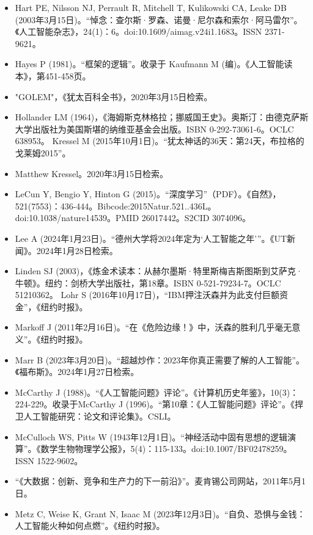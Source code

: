 \begin{itemize}
\item Hart PE, Nilsson NJ, Perrault R, Mitchell T, Kulikowski CA, Leake DB (2003年3月15日)。“悼念：查尔斯·罗森、诺曼·尼尔森和索尔·阿马雷尔”。《人工智能杂志》，24(1)：6。doi:10.1609/aimag.v24i1.1683。ISSN 2371-9621。  
\item Hayes P (1981)。“框架的逻辑”。收录于 Kaufmann M (编)。《人工智能读本》，第451-458页。  
\item "GOLEM"，《犹太百科全书》，2020年3月15日检索。  
\item Hollander LM (1964)，《海姆斯克林格拉；挪威国王史》。奥斯汀：由德克萨斯大学出版社为美国斯堪的纳维亚基金会出版。ISBN 0-292-73061-6。OCLC 638953。  
Kressel M (2015年10月1日)。“犹太神话的36天：第24天，布拉格的戈莱姆2015”。\item Matthew Kressel。2020年3月15日检索。  
\item LeCun Y, Bengio Y, Hinton G (2015)。“深度学习”（PDF）。《自然》，521(7553)：436-444。Bibcode:2015Natur.521..436L。doi:10.1038/nature14539。PMID 26017442。S2CID 3074096。  
\item Lee A (2024年1月23日)。“德州大学将2024年定为‘人工智能之年’”。《UT新闻》。2024年1月28日检索。  
\item Linden SJ (2003)，《炼金术读本：从赫尔墨斯·特里斯梅吉斯图斯到艾萨克·牛顿》。纽约：剑桥大学出版社，第18章。ISBN 0-521-79234-7。OCLC 51210362。  
Lohr S (2016年10月17日)，“IBM押注沃森并为此支付巨额资金”，《纽约时报》。  
\item Markoff J (2011年2月16日)。“在《危险边缘！》中，沃森的胜利几乎毫无意义”。《纽约时报》。  
\item Marr B (2023年3月20日)。“超越炒作：2023年你真正需要了解的人工智能”。《福布斯》。2024年1月27日检索。  
\item McCarthy J (1988)。“《人工智能问题》评论”。《计算机历史年鉴》，10(3)：224-229。收录于McCarthy J (1996)。“第10章：《人工智能问题》评论”。《捍卫人工智能研究：论文和评论集》。CSLI。  
\item McCulloch WS, Pitts W (1943年12月1日)。“神经活动中固有思想的逻辑演算”。《数学生物物理学公报》，5(4)：115-133。doi:10.1007/BF02478259。ISSN 1522-9602。
\item “《大数据：创新、竞争和生产力的下一前沿》”。麦肯锡公司网站，2011年5月1日。  
\item Metz C, Weise K, Grant N, Isaac M (2023年12月3日)。“自负、恐惧与金钱：人工智能火种如何点燃”。《纽约时报》。


\end{itemize}
